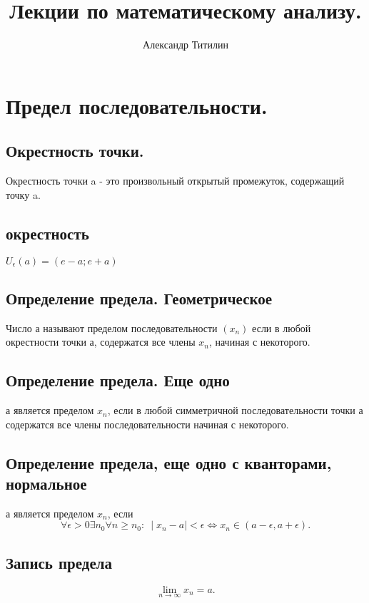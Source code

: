 \documentclass[a4paper]{scrartcl}
\title{Лекции по математическому анализу.}
\author{Александр Титилин}
\date{}
\begin{document}
\maketitle
\tableofcontents
\section{Предел последовательности.}
\subsection{Окрестность точки.}
Окрестность точки a - это произвольный открытый промежуток, содержащий точку a.
\subsection{окрестность}
$U_{\epsilon}(a) = ( e - a  ; e + a )$
\subsection{Определение предела. Геометрическое}
Число а называют пределом последовательности $(x_n)$ если в любой окрестности точки а,
содержатся все члены  $x_n$, начиная с некоторого.
\subsection{Определение предела. Еще одно}
а является пределом $x_n$, если в любой симметричной последовательности точки а содержатся все
члены последовательности начиная с некоторого.
\subsection{Определение предела, еще одно с кванторами, нормальное}
а является пределом $x_n$, если
\[
	\forall \epsilon > 0 \exists n_0 \forall n \ge n_0:~ \mid x_n - a \mid < \epsilon \Leftrightarrow
	x_n \in (a-\epsilon,a+\epsilon)
	.\]
\subsection{Запись предела}
\[
	\lim_{n \to \infty} x_n = a
	.\]
\end{document}
